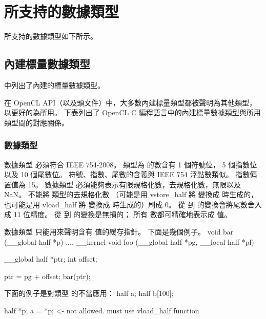 \section{所支持的數據類型}

所支持的數據類型如下所示。

\subsection{內建標量數據類型}

中列出了內建的標量數據類型。


在 OpenCL API（以及頭文件）中，大多數內建標量類型都被聲明為其他類型，
以更好的為所用。
下表列出了 OpenCL C 編程語言中的內建標量數據類型與所用類型間的對應關係。



\subsubsection{數據類型 }

數據類型  必須符合 IEEE 754-2008。
類型為  的數含有 1 個符號位， 5 個指數位以及 10 個尾數位。
符號、指數、尾數的含義與 IEEE 754 浮點數類似。
指數偏置值為 15。
數據類型  必須能夠表示有限規格化數，去規格化數，無限以及 NaN。
不能將  類型的去規格化數
（可能是用 vstore_half 將  變換成  時生成的，
也可能是用 vload_half 將  變換成  時生成的）刷成 0。
從  到  的變換會將尾數舍入成 11 位精度。
從   到  的變換是無損的；
所有  數都可精確地表示成  值。

數據類型  只能用來聲明含有  值的緩存指針。
下面是幾個例子。
\startclc
void bar (__global half *p)
{
	....
}
__kernel void foo (__global half *pg, __local half *pl)
{
	__global half *ptr;
	int offset;

	ptr = pg + offset;
	bar(ptr);
}
\stopclc

下面的例子是對類型  的不當應用：
\startclc
half a;
half b[100];

half *p;
a = *p;		<- not allowed. must use vload_half function
\stopclc

